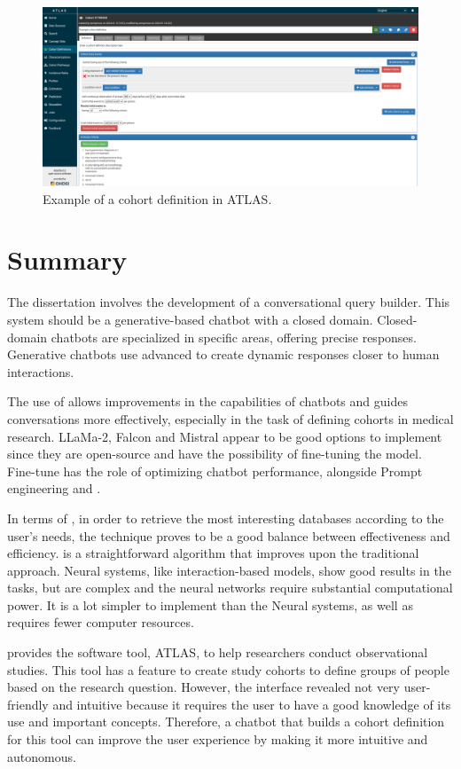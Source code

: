 \begin{figure}[ht]
    \includegraphics[width=\textwidth]{figs/chapter2/atlas.png}
    \centering
    \caption[Example of a cohort definition in ATLAS]{Example of a cohort definition in ATLAS.}
    \label{fig_atlas}
\end{figure}


\section{Summary}

The dissertation involves the development of a conversational query builder. This system should be a generative-based chatbot with a closed domain. Closed-domain chatbots are specialized in specific areas, offering precise responses. Generative chatbots use advanced {\lm} to create dynamic responses closer to human interactions.

The use of {\llm} allows improvements in the {\nlg} capabilities of chatbots and guides conversations more effectively, especially in the task of defining cohorts in medical research. LLaMa-2, Falcon and Mistral appear to be good options to implement since they are open-source and have the possibility of fine-tuning the model. Fine-tune has the role of optimizing chatbot performance, alongside Prompt engineering and {\rag}. 

In terms of {\ir}, in order to retrieve the most interesting databases according to the user's needs, the {\bm} technique proves to be a good balance between effectiveness and efficiency. {\bm} is a straightforward algorithm that improves upon the traditional {\tfidf} approach. Neural {\ir} systems, like interaction-based models, show good results in the {\ir} tasks, but are complex and the neural networks require substantial computational power. It is a lot simpler to implement than the Neural {\ir} systems, as well as requires fewer computer resources. 


{\ohdsi} provides the software tool, ATLAS, to help researchers conduct observational studies. This tool has a feature to create study cohorts to define groups of people based on the research question. However, the interface revealed not very user-friendly and intuitive because it requires the user to have a good knowledge of its use and important concepts. Therefore, a chatbot that builds a cohort definition for this tool can improve the user experience by making it more intuitive and autonomous.


